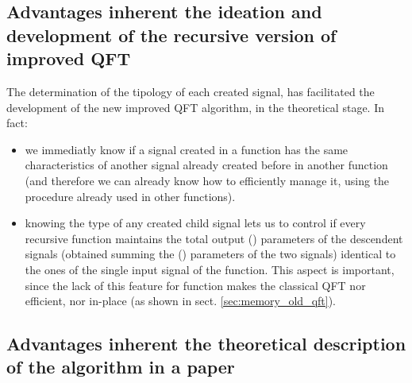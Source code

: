 \documentclass[a4paper,10pt]{article}
\begin{document}
\subsection{Advantages inherent the ideation and development of the recursive version of improved QFT}

The determination of the tipology of each created signal, has facilitated the development of the new improved QFT algorithm, in the theoretical stage.
In fact:
\begin{itemize}
\item
we immediatly know if a signal created in a function has the same characteristics of another signal already created before in another function (and therefore we can already know how to efficiently manage it, using the procedure already used in other functions).
 

\item
knowing the type of any created child signal lets us to control if every recursive function maintains the total output  () parameters of the descendent signals (obtained summing the  () parameters of the two signals) identical to the ones of the single input signal of the function.
This aspect is important, since the lack of this feature for  function makes the classical QFT nor efficient, nor in-place 
(as shown in sect. \ref{sec:memory_old_qft}).


\end{itemize}







\subsection{Advantages inherent the theoretical description of the algorithm in a paper}
\end{document}

